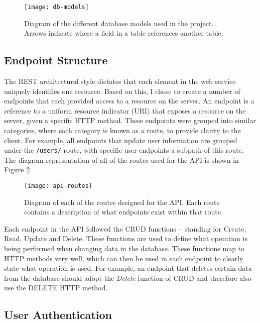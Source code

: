 
\begin{figure}[hbt]
  \centering
  \texttt{[image: db-models]}
  \caption{Diagram of the different database models used in the project. Arrows indicate where a field in a table references another table.}
  \label{fig:db-models}
\end{figure}

\subsection{Endpoint Structure}

The REST architectural style dictates that each element in the web service uniquely identifies one resource. Based on this, I chose to create a number of endpoints that each provided access to a resource on the server. An endpoint is a reference to a uniform resource indicator (URI) that exposes a resource on the server, given a specific HTTP method. These endpoints were grouped into similar categories, where each category is known as a route, to provide clarity to the client. For example, all endpoints that update user information are grouped under the \texttt{/users/} route, with specific user endpoints a subpath of this route. The diagram representation of all of the routes used for the API is shown in Figure \ref{fig:api-routes}.

\begin{figure}[hbt]
  \centering
  \texttt{[image: api-routes]}
  \caption{Diagram of each of the routes designed for the API. Each route contains a description of what endpoints exist within that route.}
  \label{fig:api-routes}
\end{figure}

Each endpoint in the API followed the CRUD functions -- standing for Create, Read, Update and Delete. These functions are used to define what operation is being performed when changing data in the database. These functions map to HTTP methods very well, which can then be used in each endpoint to clearly state what operation is used. For example, an endpoint that deletes certain data from the database should adopt the \textit{Delete} function of CRUD and therefore also use the DELETE HTTP method.

\subsection{User Authentication}

